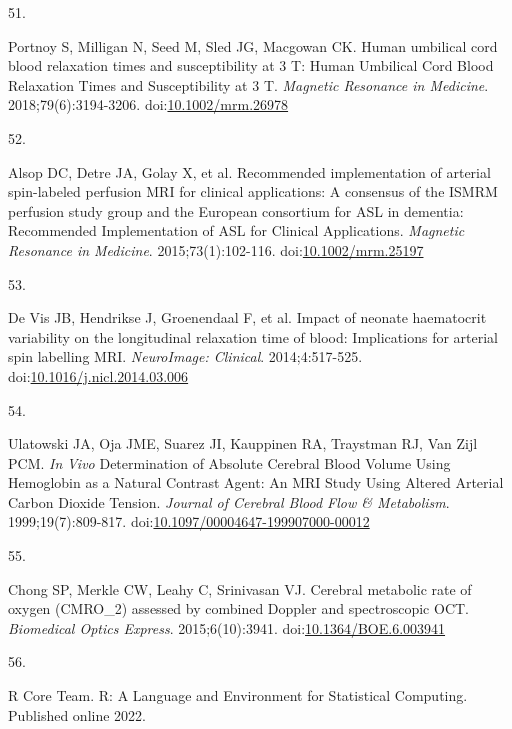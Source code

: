 \documentclass[
  letterpaper,
  DIV=11,
  numbers=noendperiod]{scrartcl}
\newlength{\cslhangindent}
\newlength{\csllabelwidth}
\newenvironment{CSLReferences}[2] %
 {\begin{list}{}{%
  \setlength{\itemindent}{0pt}
  \setlength{\leftmargin}{0pt}
  \setlength{\parsep}{0pt}
  \ifodd #1
   \setlength{\leftmargin}{\cslhangindent}
   \setlength{\itemindent}{-1\cslhangindent}
  \fi
  \setlength{\itemsep}{#2\baselineskip}}}
 {\end{list}}
\newcommand{\CSLLeftMargin}[1]{\parbox[t]{\csllabelwidth}{\strut#1\strut}}
\newcommand{\CSLRightInline}[1]{\parbox[t]{\linewidth - \csllabelwidth}{\strut#1\strut}}
\begin{document}
\begin{CSLReferences}{0}{1}
\CSLLeftMargin{51. }%
\CSLRightInline{Portnoy S, Milligan N, Seed M, Sled JG, Macgowan CK.
Human umbilical cord blood relaxation times and susceptibility at 3 {T}:
{Human Umbilical Cord Blood Relaxation Times} and {Susceptibility} at 3
{T}. \emph{Magnetic Resonance in Medicine}. 2018;79(6):3194-3206.
doi:\href{https://doi.org/10.1002/mrm.26978}{10.1002/mrm.26978}}

\CSLLeftMargin{52. }%
\CSLRightInline{Alsop DC, Detre JA, Golay X, et al. Recommended
implementation of arterial spin-labeled perfusion {MRI} for clinical
applications: {A} consensus of the {ISMRM} perfusion study group and the
{European} consortium for {ASL} in dementia: {Recommended
Implementation} of {ASL} for {Clinical Applications}. \emph{Magnetic
Resonance in Medicine}. 2015;73(1):102-116.
doi:\href{https://doi.org/10.1002/mrm.25197}{10.1002/mrm.25197}}

\CSLLeftMargin{53. }%
\CSLRightInline{De Vis JB, Hendrikse J, Groenendaal F, et al. Impact of
neonate haematocrit variability on the longitudinal relaxation time of
blood: {Implications} for arterial spin labelling {MRI}.
\emph{NeuroImage: Clinical}. 2014;4:517-525.
doi:\href{https://doi.org/10.1016/j.nicl.2014.03.006}{10.1016/j.nicl.2014.03.006}}

\CSLLeftMargin{54. }%
\CSLRightInline{Ulatowski JA, Oja JME, Suarez JI, Kauppinen RA,
Traystman RJ, Van Zijl PCM. {\emph{In} }{\emph{Vivo}} {Determination} of
{Absolute Cerebral Blood Volume Using Hemoglobin} as a {Natural Contrast
Agent}: {An MRI Study Using Altered Arterial Carbon Dioxide Tension}.
\emph{Journal of Cerebral Blood Flow \& Metabolism}. 1999;19(7):809-817.
doi:\href{https://doi.org/10.1097/00004647-199907000-00012}{10.1097/00004647-199907000-00012}}

\CSLLeftMargin{55. }%
\CSLRightInline{Chong SP, Merkle CW, Leahy C, Srinivasan VJ. Cerebral
metabolic rate of oxygen ({CMRO}\_2) assessed by combined {Doppler} and
spectroscopic {OCT}. \emph{Biomedical Optics Express}. 2015;6(10):3941.
doi:\href{https://doi.org/10.1364/BOE.6.003941}{10.1364/BOE.6.003941}}

\CSLLeftMargin{56. }%
\CSLRightInline{R Core Team. R: {A Language} and {Environment} for
{Statistical Computing}. Published online 2022.}


\end{CSLReferences}
\end{document}
